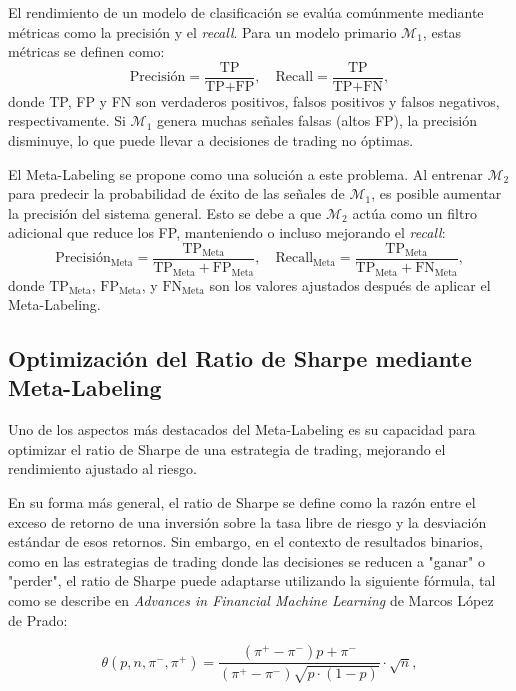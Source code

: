\documentclass[a4paper,12pt, twoside]{report}
\begin{document}
El rendimiento de un modelo de clasificación se evalúa comúnmente mediante métricas 
como la precisión y el \textit{recall}. Para un modelo primario $\mathcal{M}_1$, 
estas métricas se definen como:
\[
\text{Precisión} = \frac{\text{TP}}{\text{TP} + \text{FP}}, \quad \text{Recall} = \frac{\text{TP}}{\text{TP} + \text{FN}},
\]
donde TP, FP y FN son verdaderos positivos, falsos positivos y falsos negativos, 
respectivamente. Si $\mathcal{M}_1$ genera muchas señales falsas (altos FP), 
la precisión disminuye, lo que puede llevar a decisiones de trading no óptimas.

El Meta-Labeling se propone como una solución a este problema. Al entrenar 
$\mathcal{M}_2$ para predecir la probabilidad de éxito de las señales de 
$\mathcal{M}_1$, es posible aumentar la precisión del sistema general. Esto 
se debe a que $\mathcal{M}_2$ actúa como un filtro adicional que reduce los 
FP, manteniendo o incluso mejorando el \textit{recall}:
\[
\text{Precisión}_{\text{Meta}} = \frac{\text{TP}_{\text{Meta}}}{\text{TP}_{\text{Meta}} + \text{FP}_{\text{Meta}}}, \quad \text{Recall}_{\text{Meta}} = \frac{\text{TP}_{\text{Meta}}}{\text{TP}_{\text{Meta}} + \text{FN}_{\text{Meta}}},
\]
donde $\text{TP}_{\text{Meta}}$, $\text{FP}_{\text{Meta}}$, y $\text{FN}_{\text{Meta}}$ 
son los valores ajustados después de aplicar el Meta-Labeling.


\subsection{Optimización del Ratio de Sharpe mediante Meta-Labeling}

Uno de los aspectos más destacados del Meta-Labeling es su capacidad para optimizar el 
ratio de Sharpe de una estrategia de trading, mejorando el rendimiento ajustado al riesgo. 


En su forma más general, el ratio de Sharpe se define como la razón entre el exceso 
de retorno de una inversión sobre la tasa libre de riesgo y la desviación estándar 
de esos retornos. Sin embargo, en el contexto de resultados binarios, como en las 
estrategias de trading donde las decisiones se reducen a "ganar" o "perder", el ratio 
de Sharpe puede adaptarse utilizando la siguiente fórmula, tal como se describe en 
\textit{Advances in Financial Machine Learning} 
de Marcos López de Prado:

\begin{equation}
\theta(p, n, \pi^-, \pi^+) = \frac{(\pi^+ - \pi^-) p + \pi^-}{(\pi^+ - \pi^-) \sqrt{p \cdot (1 - p)}} \cdot \sqrt{n},
\end{equation}
\end{document}
